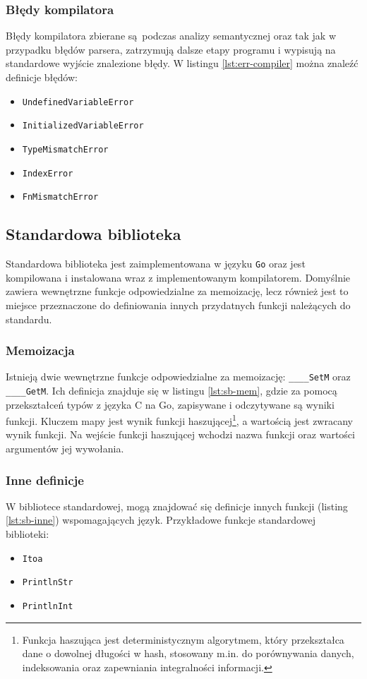 \newpage
\subsubsection{Błędy kompilatora}

Błędy kompilatora zbierane są podczas analizy semantycznej oraz tak jak w przypadku błędów parsera, zatrzymują dalsze etapy programu i wypisują na standardowe wyjście znalezione błędy. W listingu \ref{lst:err-compiler} można znaleźć definicje błędów:

\begin{itemize}
    \item \verb|UndefinedVariableError|
    \item \verb|InitializedVariableError|
    \item \verb|TypeMismatchError|
    \item \verb|IndexError|
    \item \verb|FnMismatchError|
\end{itemize}

\subsection{Standardowa biblioteka}

Standardowa biblioteka jest zaimplementowana w języku \verb|Go| oraz jest kompilowana i instalowana wraz z implementowanym kompilatorem. Domyślnie zawiera wewnętrzne funkcje odpowiedzialne za memoizację, lecz również jest to miejsce przeznaczone do definiowania innych przydatnych funkcji należących do standardu.

\subsubsection{Memoizacja}

Istnieją dwie wewnętrzne funkcje odpowiedzialne za memoizację: \verb|____SetM| oraz \verb|____GetM|. Ich definicja znajduje się w listingu \ref{lst:sb-mem}, gdzie za pomocą przekształceń typów z języka C na Go, zapisywane i odczytywane są wyniki funkcji. Kluczem mapy jest wynik funkcji haszującej\footnote{Funkcja haszująca jest deterministycznym algorytmem, który przekształca dane o dowolnej długości w hash, stosowany m.in. do porównywania danych, indeksowania oraz zapewniania integralności informacji.}, a wartością jest zwracany wynik funkcji. Na wejście funkcji haszującej wchodzi nazwa funkcji oraz wartości argumentów jej wywołania.

\subsubsection{Inne definicje}

W bibliotece standardowej, mogą znajdować się definicje innych funkcji (listing \ref{lst:sb-inne}) wspomagających język. Przykładowe funkcje standardowej biblioteki:
\begin{itemize}
    \item \verb|Itoa|
    \item \verb|PrintlnStr|
    \item \verb|PrintlnInt|
\end{itemize}

